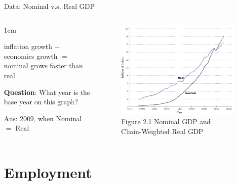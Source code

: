 \documentclass[11pt,aspectratio=43]{beamer}
\let\olditemize=\itemize
\let\endolditemize=\enditemize
\renewenvironment{itemize}{\olditemize \itemsep1em}{\endolditemize}
\theoremstyle{definition}
\begin{document}
\begin{frame}{Data: Nominal v.s. Real GDP}
\label{slide:Data__Nominal_v_s__Real_GDP}
    \begin{columns}
        \begin{column}{0.3\textwidth}
            \begin{itemize}
                \item inflation growth $ + $ economics growth $ = $ nominal grows faster than real
                \item \textbf{Question}: \alert{What year is the base year} on this graph?
                \item Ans: 2009, when Nominal $ = $ Real
            \end{itemize}
        \end{column}
        \begin{column}{0.7\textwidth}
            \begin{figure}
                \caption{Figure 2.1 Nominal GDP and Chain-Weighted Real GDP}
                \includegraphics[width=\textwidth]{./figures/Figure2_1.png}
            \end{figure}
        \end{column}
    \end{columns}
\end{frame}

\section{Employment}
\label{sec:Employment}
\end{document}
